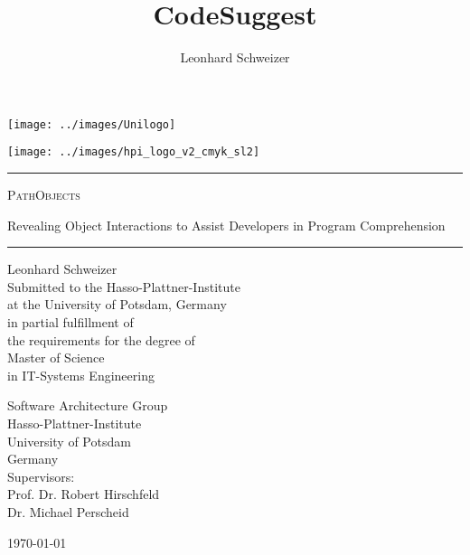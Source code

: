 \title{CodeSuggest}
\author{Leonhard Schweizer}
\begin{titlepage}
\pagestyle{empty}

\noindent
\begin{minipage}[b]{0.4\linewidth}
\noindent
\texttt{[image: ../images/Unilogo]}
\end{minipage}
\hfill
\begin{minipage}[b]{0.4\linewidth}
\hfill
\vspace{3mm}
\texttt{[image: ../images/hpi\_logo\_v2\_cmyk\_sl2]}
\end{minipage}

\vspace{2cm}

\begin{center}
\begin{minipage}{0.7\textwidth}
\begin{center}
\begin{large}
\hrule
\vspace{2em}
\textsc{\Huge \textsc{PathObjects} \\[0.5em]}
\begin{doublespace}
  {\LARGE Revealing Object Interactions to Assist Developers in Program Comprehension}
  \\[1.2em]
\end{doublespace}
\hrule
\vspace{1.5cm}

{\huge Leonhard Schweizer } \\[1.5cm]

Submitted to the Hasso-Plattner-Institute \\
at the University of Potsdam, Germany \\
in partial fulfillment of \\
the requirements for the degree of \\[5mm]
{\Large Master of Science} \\[1mm]
in IT-Systems Engineering \\[2cm]

\begin{multicols}{2}
Software Architecture Group\\
Hasso-Plattner-Institute\\
University of Potsdam \\
Germany \\
Supervisors: \\
Prof. Dr. Robert Hirschfeld \\
Dr. Michael Perscheid \\
\end{multicols}
\end{large}
\end{center}
\end{minipage}
\vfill
{\LARGE \today \\ ~ }
\end{center}
\end{titlepage}
\restoregeometry
\cleardoublepage